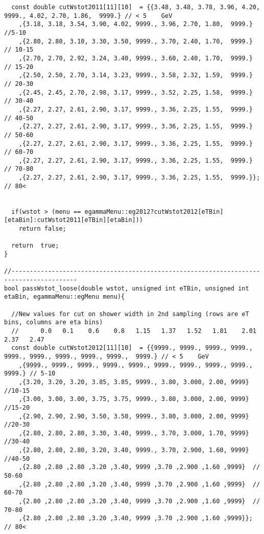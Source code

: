 \begin{lstlisting}
  const double cutWstot2011[11][10]  = {{3.48, 3.48, 3.78, 3.96, 4.20, 9999., 4.02, 2.70, 1.86,  9999.} // < 5    GeV
	,{3.18, 3.18, 3.54, 3.90, 4.02, 9999., 3.96, 2.70, 1.80,  9999.} //5-10   
	,{2.80, 2.80, 3.10, 3.30, 3.50, 9999., 3.70, 2.40, 1.70,  9999.} // 10-15 
	,{2.70, 2.70, 2.92, 3.24, 3.40, 9999., 3.60, 2.40, 1.70,  9999.} // 15-20 
	,{2.50, 2.50, 2.70, 3.14, 3.23, 9999., 3.58, 2.32, 1.59,  9999.} // 20-30  
	,{2.45, 2.45, 2.70, 2.98, 3.17, 9999., 3.52, 2.25, 1.58,  9999.} // 30-40  
	,{2.27, 2.27, 2.61, 2.90, 3.17, 9999., 3.36, 2.25, 1.55,  9999.} // 40-50  
	,{2.27, 2.27, 2.61, 2.90, 3.17, 9999., 3.36, 2.25, 1.55,  9999.} // 50-60  
	,{2.27, 2.27, 2.61, 2.90, 3.17, 9999., 3.36, 2.25, 1.55,  9999.} // 60-70  
	,{2.27, 2.27, 2.61, 2.90, 3.17, 9999., 3.36, 2.25, 1.55,  9999.} // 70-80  
	,{2.27, 2.27, 2.61, 2.90, 3.17, 9999., 3.36, 2.25, 1.55,  9999.}};  // 80<    


  if(wstot > (menu == egammaMenu::eg2012?cutWstot2012[eTBin][etaBin]:cutWstot2011[eTBin][etaBin]))
    return false;
    
  return  true;
}

//----------------------------------------------------------------------------------------
bool passWstot_loose(double wstot, unsigned int eTBin, unsigned int etaBin, egammaMenu::egMenu menu){
  
  //New values for cut on shower width in 2nd sampling (rows are eT bins, columns are eta bins)
  //      0.0   0.1    0.6    0.8   1.15   1.37   1.52   1.81    2.01   2.37   2.47
  const double cutWstot2012[11][10]  = {{9999., 9999., 9999., 9999., 9999., 9999., 9999., 9999., 9999.,  9999.} // < 5    GeV
	,{9999., 9999., 9999., 9999., 9999., 9999., 9999., 9999., 9999.,  9999.} // 5-10   
	,{3.20, 3.20, 3.20, 3.85, 3.85, 9999., 3.80, 3.000, 2.00, 9999} //10-15
	,{3.00, 3.00, 3.00, 3.75, 3.75, 9999., 3.80, 3.000, 2.00, 9999} //15-20
	,{2.90, 2.90, 2.90, 3.50, 3.50, 9999., 3.80, 3.000, 2.00, 9999} //20-30
	,{2.80, 2.80, 2.80, 3.30, 3.40, 9999., 3.70, 3.000, 1.70, 9999} //30-40
	,{2.80, 2.80, 2.80, 3.20, 3.40, 9999., 3.70, 2.900, 1.60, 9999} //40-50
	,{2.80 ,2.80 ,2.80 ,3.20 ,3.40, 9999 ,3.70 ,2.900 ,1.60 ,9999}  // 50-60  
	,{2.80 ,2.80 ,2.80 ,3.20 ,3.40, 9999 ,3.70 ,2.900 ,1.60 ,9999}  // 60-70   
	,{2.80 ,2.80 ,2.80 ,3.20 ,3.40, 9999 ,3.70 ,2.900 ,1.60 ,9999}  // 70-80   
	,{2.80 ,2.80 ,2.80 ,3.20 ,3.40, 9999 ,3.70 ,2.900 ,1.60 ,9999}};   // 80<    


\end{lstlisting}
